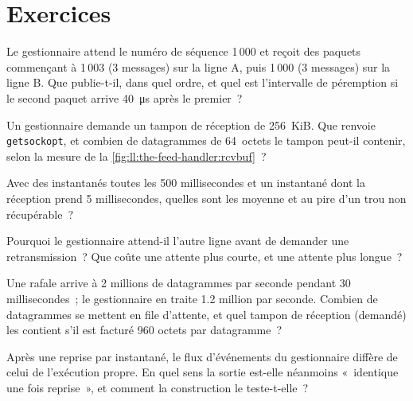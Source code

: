 \section{Exercices}

\begin{exercise}[$\star$]\label{exo:ll:the-feed-handler:1}
Le gestionnaire attend le numéro de séquence 1\,000 et reçoit des paquets commençant à 1\,003 (3 messages) sur la ligne A, puis 1\,000 (3
messages) sur la ligne B. Que publie-t-il, dans quel ordre, et quel est l'intervalle de péremption si le second paquet arrive
\qty{40}{\micro\second} après le premier~?
\end{exercise}

\begin{exercise}[$\star$]\label{exo:ll:the-feed-handler:2}
Un gestionnaire demande un tampon de réception de 256~KiB. Que renvoie \texttt{getsockopt}, et combien de datagrammes de 64~octets le
tampon peut-il contenir, selon la mesure de la \cref{fig:ll:the-feed-handler:rcvbuf}~?
\end{exercise}

\begin{exercise}[$\star$]\label{exo:ll:the-feed-handler:3}
Avec des instantanés toutes les 500 millisecondes et un instantané dont la réception prend 5 millisecondes, quelles sont les 
moyenne et au pire d'un trou non récupérable~?
\end{exercise}

\begin{exercise}[$\star\star$]\label{exo:ll:the-feed-handler:4}
Pourquoi le gestionnaire attend-il l'autre ligne avant de demander une retransmission~? Que coûte une attente plus courte, et une
attente plus longue~?
\end{exercise}

\begin{exercise}[$\star\star$]\label{exo:ll:the-feed-handler:5}
Une rafale arrive à 2 millions de datagrammes par seconde pendant 30 millisecondes~; le gestionnaire en traite 1.2 million par seconde. Combien de
datagrammes se mettent en file d'attente, et quel tampon de réception (demandé) les contient s'il est facturé 960 octets par datagramme~?
\end{exercise}

\begin{exercise}[$\star\star$]\label{exo:ll:the-feed-handler:6}
Après une reprise par instantané, le flux d'événements du gestionnaire diffère de celui de l'exécution propre. En quel sens la sortie est-elle néanmoins
«~identique une fois reprise~», et comment la construction le teste-t-elle~?
\end{exercise}

